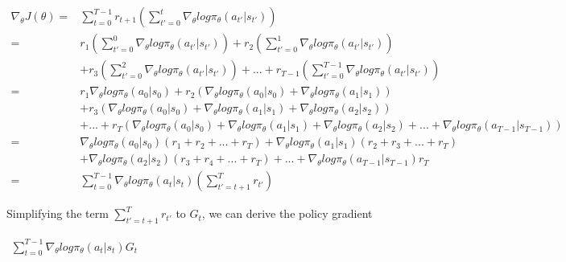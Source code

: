 \documentclass[letterpaper,11pt]{article}
\begin{document}
$\begin{aligned}
    \nabla_{\theta} J(\theta) ={}& \sum_{t=0}^{T-1} r_{t+1} (\sum_{t'=0}^{t} \nabla_{\theta} log \pi_{\theta}(a_{t'} | s_{t'})) \\
                              ={}&  r_{1} (\sum_{t'=0}^{0} \nabla_{\theta} log \pi_{\theta}(a_{t'} | s_{t'})) + r_{2} (\sum_{t'=0}^{1} \nabla_{\theta} log \pi_{\theta}(a_{t'} | s_{t'})) \\
                                 & + r_{3} (\sum_{t'=0}^{2} \nabla_{\theta} log \pi_{\theta}(a_{t'} | s_{t'})) + ... + r_{T-1} (\sum_{t'=0}^{T-1} \nabla_{\theta} log \pi_{\theta}(a_{t'} | s_{t'})) \\
                              ={}& r_{1} \nabla_{\theta} log \pi_{\theta} (a_{0} | s_{0}) + r_{2} (\nabla_{\theta} log \pi_{\theta} (a_{0} | s_{0}) + \nabla_{\theta} log \pi_{\theta} (a_{1} | s_{1})) \\
                                 & + r_{3} (\nabla_{\theta} log \pi_{\theta} (a_{0} | s_{0}) + \nabla_{\theta} log \pi_{\theta} (a_{1} | s_{1}) + \nabla_{\theta} log \pi_{\theta} (a_{2} | s_{2})) \\
                                 & + ... + r_{T} (\nabla_{\theta} log \pi_{\theta} (a_{0} | s_{0}) + \nabla_{\theta} log \pi_{\theta} (a_{1} | s_{1}) + \nabla_{\theta} log \pi_{\theta} (a_{2} | s_{2}) + ... + \nabla_{\theta} log \pi_{\theta} (a_{T-1} | s_{T-1})) \\
                              ={}&  \nabla_{\theta} log \pi_{\theta} (a_{0} | s_{0}) (r_{1} + r_{2} + ... + r_{T}) + \nabla_{\theta} log \pi_{\theta} (a_{1} | s_{1}) (r_{2} + r_{3} + ... +  r_{T}) \\
                                 & + \nabla_{\theta} log \pi_{\theta} (a_{2} | s_{2}) (r_{3} + r_{4} + ... + r_{T}) + ... + \nabla_{\theta} log \pi_{\theta} (a_{T-1} | s_{T-1}) r_{T} \\
                              ={}& \sum_{t=0}^{T-1} \nabla_{\theta} log \pi_{\theta} (a_{t} | s_{t}) (\sum_{t'=t+1}^{T} r_{t'}) 
\end{aligned}$

Simplifying the term $\sum_{t'=t+1}^{T} r_{t'}$ to $G_{t}$, we can derive the policy gradient

\begin{center}
$\begin{aligned}
    \sum_{t=0}^{T-1} \nabla_{\theta} log \pi_{\theta} (a_{t} | s_{t}) G_{t}
\end{aligned}$
\end{center}
\vspace{1.0cm}
\end{document}
